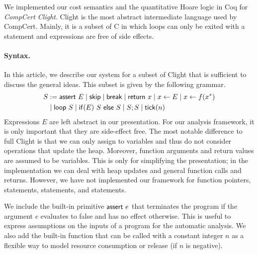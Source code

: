 \documentclass[nocopyrightspace,preprint,pldi]{sigplanconf-pldi15}
\begin{document}
{We implemented our cost semantics and the quantitative Hoare logic in
Coq for \emph{CompCert Clight}.  Clight is the most abstract
intermediate language used by CompCert.  Mainly, it is a subset of C
in which loops can only be exited with a  statement and
expressions are free of side effects.

\paragraph{Syntax.}

In this article, we describe our system for a subset of Clight that is
sufficient to discuss the general ideas.  This subset is given by the
following grammar.
%
\begin{align*}
S &:= \mathsf{assert}~E
\mid \mathsf{skip}
\mid \mathsf{break}
\mid \mathsf{return}~x
\mid x \gets E
\mid x \gets f(x^*)
\\
& \mid \mathsf{loop}~S
\mid \mathsf{if}(E)~S~\mathsf{else}~S
\mid S;S
\mid \mathsf{tick}(n)
\end{align*}
%
Expressions $E$ are left abstract in our presentation.  For our
analysis framework, it is only important that they are side-effect
free.
%
The most notable difference to full Clight is that we can only assign
to variables and thus do not consider operations that update the heap.
Moreover, function arguments and return values are assumed to be
variables.  This is only for simplifying the presentation; in the
implementation we can deal with heap updates and general function
calls and returns.  However, we have not implemented our framework for function
pointers,  statements,  statements, and
 statements.

We include the built-in primitive $\mathsf{assert}~e$ that terminates
the program if the argument $e$ evaluates to false and has no effect
otherwise.  This is useful to express assumptions on the inputs of a
program for the automatic analysis.  We also add the built-in function
 that can be called with a constant integer $n$ as a
flexible way to model resource consumption or release (if $n$ is
negative).


}
\end{document}
